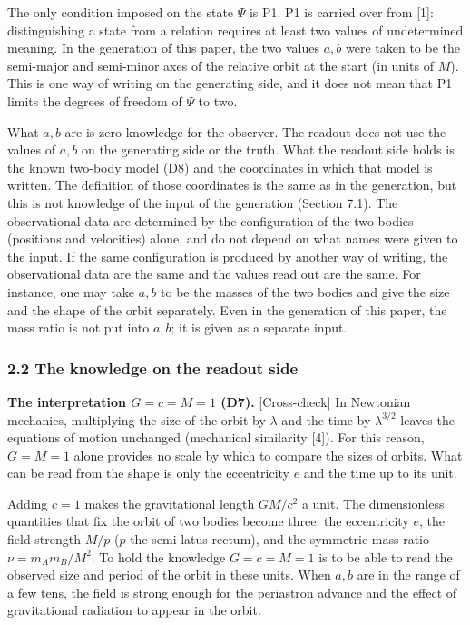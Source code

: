 \documentclass[
  a4paper,
]{article}
\begin{document}
The only condition imposed on the state \(\Psi\) is P1. P1 is carried
over from {[}1{]}: distinguishing a state from a relation requires at
least two values of undetermined meaning. In the generation of this
paper, the two values \(a, b\) were taken to be the semi-major and
semi-minor axes of the relative orbit at the start (in units of \(M\)).
This is one way of writing on the generating side, and it does not mean
that P1 limits the degrees of freedom of \(\Psi\) to two.

What \(a, b\) are is zero knowledge for the observer. The readout does
not use the values of \(a, b\) on the generating side or the truth. What
the readout side holds is the known two-body model (D8) and the
coordinates in which that model is written. The definition of those
coordinates is the same as in the generation, but this is not knowledge
of the input of the generation (Section 7.1). The observational data are
determined by the configuration of the two bodies (positions and
velocities) alone, and do not depend on what names were given to the
input. If the same configuration is produced by another way of writing,
the observational data are the same and the values read out are the
same. For instance, one may take \(a, b\) to be the masses of the two
bodies and give the size and the shape of the orbit separately. Even in
the generation of this paper, the mass ratio is not put into \(a, b\);
it is given as a separate input.

\subsubsection{2.2 The knowledge on the readout
side}\label{the-knowledge-on-the-readout-side}

\textbf{The interpretation \(G=c=M=1\) (D7).} {[}Cross-check{]} In
Newtonian mechanics, multiplying the size of the orbit by \(\lambda\)
and the time by \(\lambda^{3/2}\) leaves the equations of motion
unchanged (mechanical similarity {[}4{]}). For this reason, \(G=M=1\)
alone provides no scale by which to compare the sizes of orbits. What
can be read from the shape is only the eccentricity \(e\) and the time
up to its unit.

Adding \(c=1\) makes the gravitational length \(GM/c^2\) a unit. The
dimensionless quantities that fix the orbit of two bodies become three:
the eccentricity \(e\), the field strength \(M/p\) (\(p\) the semi-latus
rectum), and the symmetric mass ratio \(\nu=m_Am_B/M^2\). To hold the
knowledge \(G=c=M=1\) is to be able to read the observed size and period
of the orbit in these units. When \(a, b\) are in the range of a few
tens, the field is strong enough for the periastron advance and the
effect of gravitational radiation to appear in the orbit.
\end{document}
